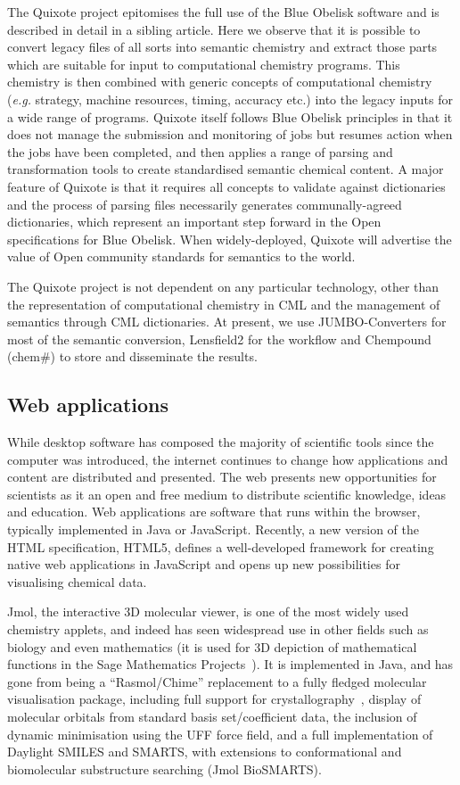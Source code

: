 \documentclass[10pt]{bmc_article}
\newenvironment{bmcformat}{\fussy\setboolean{publ}{true}}{\fussy}
\begin{document}
\begin{bmcformat}
The Quixote project epitomises the full use of the Blue Obelisk
software and is described in detail in a sibling
article. Here we observe that it is possible to convert legacy files
of all sorts into semantic chemistry and extract
those parts which are suitable for input to computational chemistry
programs. This chemistry is then combined with
generic concepts of computational chemistry ({\it e.g.} strategy,
machine resources, timing, accuracy etc.) into the
legacy inputs for a wide range of programs. Quixote itself follows
Blue Obelisk principles in that it does not manage
the submission and monitoring of jobs but resumes action when the jobs
have been completed, and then applies a range
of parsing and transformation tools to create standardised semantic
chemical content. A major feature of Quixote is
that it requires all concepts to validate against dictionaries and the
process of parsing files necessarily generates
communally-agreed dictionaries, which represent an important step
forward in the Open specifications for Blue Obelisk.
When widely-deployed, Quixote will advertise the value of Open
community standards for semantics to the world.

The Quixote project is not dependent on any particular technology,
other than the representation of computational
chemistry in CML and the management of semantics through CML
dictionaries. At present, we use JUMBO-Converters for most
 of the semantic conversion, Lensfield2 for the workflow and Chempound
(chem\#) to store and disseminate the results.

\subsection*{Web applications}

While desktop software has composed the majority of scientific tools
since the computer was introduced, the internet continues to change
how applications and content are distributed and presented. The web
presents new opportunities for scientists as it
an open and free medium to distribute scientific knowledge, ideas and
education. Web applications are software that runs within the browser,
typically implemented in Java or JavaScript.
Recently, a new version of the HTML
specification, HTML5, defines a well-developed framework
for creating native web applications in JavaScript and opens up
new possibilities for visualising chemical data.

Jmol, the interactive 3D molecular viewer, is one of the most widely used
chemistry applets, and indeed has
seen widespread use in other fields such as biology and 
even mathematics (it is used for 3D depiction of mathematical
functions in the Sage Mathematics Projects~\cite{WebSage}). It is implemented
in Java, and has gone from being a ``Rasmol/Chime'' replacement to a fully fledged molecular
visualisation package, including full support for crystallography~\cite{Hanson2010},
display of molecular orbitals from standard basis set/coefficient data,
the inclusion of dynamic minimisation using the UFF force field, and
a full implementation of Daylight SMILES and SMARTS, with extensions to
conformational and biomolecular substructure searching (Jmol
BioSMARTS).


\end{bmcformat}
\end{document}
